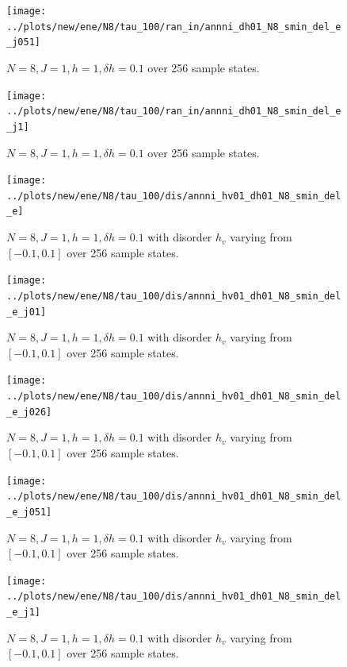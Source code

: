 \documentclass[a4paper]{article}
\begin{document}
\begin{figure}[h!]
  \centering
  \texttt{[image: ../plots/new/ene/N8/tau\_100/ran\_in/annni\_dh01\_N8\_smin\_del\_e\_j051]}
  \caption{$N = 8, J = 1, h = 1, \delta h=0.1$ over 256 sample states.}
  \label{fig:}
\end{figure}

\begin{figure}[h!]
  \centering
  \texttt{[image: ../plots/new/ene/N8/tau\_100/ran\_in/annni\_dh01\_N8\_smin\_del\_e\_j1]}
  \caption{$N = 8, J = 1, h = 1, \delta h=0.1$ over 256 sample states.}
  \label{fig:}
\end{figure}

\begin{figure}[h!]
  \centering
  \texttt{[image: ../plots/new/ene/N8/tau\_100/dis/annni\_hv01\_dh01\_N8\_smin\_del\_e]}
  \caption{$N = 8, J = 1, h = 1, \delta h=0.1$ with disorder $h_v$ varying from $[-0.1,0.1]$ over 256 sample states.}
  \label{fig:}
\end{figure}

\begin{figure}[h!]
  \centering
  \texttt{[image: ../plots/new/ene/N8/tau\_100/dis/annni\_hv01\_dh01\_N8\_smin\_del\_e\_j01]}
  \caption{$N = 8, J = 1, h = 1, \delta h=0.1$ with disorder $h_v$ varying from $[-0.1,0.1]$ over 256 sample states.}
  \label{fig:}
\end{figure}

\begin{figure}[h!]
  \centering
  \texttt{[image: ../plots/new/ene/N8/tau\_100/dis/annni\_hv01\_dh01\_N8\_smin\_del\_e\_j026]}
  \caption{$N = 8, J = 1, h = 1, \delta h=0.1$ with disorder $h_v$ varying from $[-0.1,0.1]$ over 256 sample states.}
  \label{fig:}
\end{figure}

\begin{figure}[h!]
  \centering
  \texttt{[image: ../plots/new/ene/N8/tau\_100/dis/annni\_hv01\_dh01\_N8\_smin\_del\_e\_j051]}
  \caption{$N = 8, J = 1, h = 1, \delta h=0.1$ with disorder $h_v$ varying from $[-0.1,0.1]$ over 256 sample states.}
  \label{fig:}
\end{figure}

\begin{figure}[h!]
  \centering
  \texttt{[image: ../plots/new/ene/N8/tau\_100/dis/annni\_hv01\_dh01\_N8\_smin\_del\_e\_j1]}
  \caption{$N = 8, J = 1, h = 1, \delta h=0.1$ with disorder $h_v$ varying from $[-0.1,0.1]$ over 256 sample states.}
  \label{fig:}
\end{figure}
\end{document}
